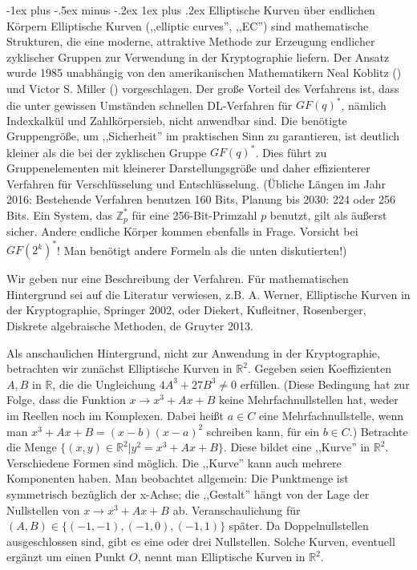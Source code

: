 \documentclass[a4paper]{article}
\makeatletter
\renewcommand{\subsubsection}{\@startsection{subsubsection}{3}{0mm}%
 {-1ex plus -.5ex minus -.2ex}%
 {1ex plus .2ex}%
 {\normalfont\small\bfseries}}
\makeatother
\begin{document}
\begin{multicols}{3}
    \subsubsection{Elliptische Kurven über endlichen Körpern}
    Elliptische Kurven (,,elliptic curves'', ,,EC'') sind mathematische Strukturen, die eine moderne, attraktive Methode zur Erzeugung endlicher zyklischer Gruppen zur Verwendung in der Kryptographie liefern. Der Ansatz wurde 1985 unabhängig von den amerikanischen Mathematikern Neal Koblitz () und Victor S. Miller () vorgeschlagen. Der große Vorteil des Verfahrens ist, dass die unter gewissen Umständen schnellen DL-Verfahren für $GF(q)^*$, nämlich Indexkalkül und Zahlkörpersieb, nicht anwendbar sind. Die benötigte Gruppengröße, um ,,Sicherheit'' im praktischen Sinn zu garantieren, ist deutlich kleiner als die bei der zyklischen Gruppe $GF(q)^*$. Dies führt zu Gruppenelementen mit kleinerer Darstellungsgröße und daher effizienterer Verfahren für Verschlüsselung und Entschlüsselung.
    (Übliche Längen im Jahr 2016: Bestehende Verfahren benutzen 160 Bits, Planung bis 2030: 224 oder 256 Bits. Ein System, das $\mathbb{Z}^*_p$ für eine 256-Bit-Primzahl $p$ benutzt, gilt als äußerst sicher. Andere endliche Körper kommen ebenfalls in Frage. Vorsicht bei $GF(2^k)^*$! Man benötigt andere Formeln als die unten diskutierten!)

    Wir geben nur eine Beschreibung der Verfahren. Für mathematischen Hintergrund sei auf die Literatur verwiesen, z.B. A. Werner, Elliptische Kurven in der Kryptographie, Springer 2002, oder Diekert, Kufleitner, Rosenberger, Diskrete algebraische Methoden, de Gruyter 2013.

    Als anschaulichen Hintergrund, nicht zur Anwendung in der Kryptographie, betrachten wir zunächst Elliptische Kurven in $\mathbb{R}^2$. Gegeben seien Koeffizienten $A, B$ in $\mathbb{R}$, die die Ungleichung $4A^3+ 27B^3 \not= 0$ erfüllen. (Diese Bedingung hat zur Folge, dass die Funktion $x\rightarrow x^3+Ax+B$ keine Mehrfachnullstellen hat, weder im Reellen noch im Komplexen. Dabei heißt $a\in C$ eine Mehrfachnullstelle, wenn man $x^3+Ax+B= (x-b)(x-a)^2$ schreiben kann, für ein $b\in C$.) Betrachte die Menge $\{(x,y)\in\mathbb{R}^2| y^2=x^3+Ax+B\}$.
    Diese bildet eine ,,Kurve'' in $\mathbb{R}^2$. Verschiedene Formen sind möglich. Die ,,Kurve'' kann auch mehrere Komponenten haben. Man beobachtet allgemein: Die Punktmenge ist symmetrisch bezüglich der x-Achse; die ,,Gestalt'' hängt von der Lage der Nullstellen von $x\rightarrow x^3+Ax+B$ ab. Veranschaulichung für $(A,B)\in\{(- 1 ,-1),(- 1 ,0),(- 1 ,1)\}$ später. Da Doppelnullstellen ausgeschlossen sind, gibt es eine oder drei Nullstellen.
    Solche Kurven, eventuell ergänzt um einen Punkt $O$, nennt man Elliptische Kurven in $\mathbb{R}^2$.


\end{multicols}
\end{document}
